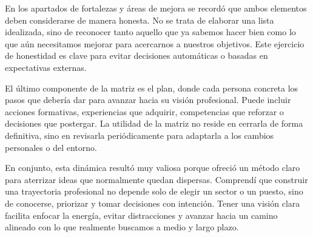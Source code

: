 En los apartados de fortalezas y áreas de mejora se recordó que ambos elementos deben considerarse de manera honesta. No se trata de elaborar una lista idealizada, sino de reconocer tanto aquello que ya sabemos hacer bien como lo que aún necesitamos mejorar para acercarnos a nuestros objetivos. Este ejercicio de honestidad es clave para evitar decisiones automáticas o basadas en expectativas externas.

El último componente de la matriz es el plan, donde cada persona concreta los pasos que debería dar para avanzar hacia su visión profesional. Puede incluir acciones formativas, experiencias que adquirir, competencias que reforzar o decisiones que postergar. La utilidad de la matriz no reside en cerrarla de forma definitiva, sino en revisarla periódicamente para adaptarla a los cambios personales o del entorno.

En conjunto, esta dinámica resultó muy valiosa porque ofreció un método claro para aterrizar ideas que normalmente quedan dispersas. Comprendí que construir una trayectoria profesional no depende solo de elegir un sector o un puesto, sino de conocerse, priorizar y tomar decisiones con intención. Tener una visión clara facilita enfocar la energía, evitar distracciones y avanzar hacia un camino alineado con lo que realmente buscamos a medio y largo plazo.
